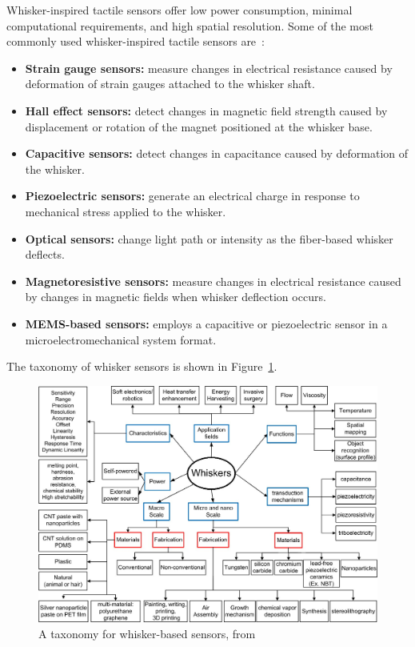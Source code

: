 Whisker-inspired tactile sensors offer low power consumption, minimal computational requirements, and high spatial resolution.
Some of the most commonly used whisker-inspired tactile sensors are~\cite{s22072705}:
\begin{itemize}
    \item \textbf{Strain gauge sensors:} measure changes in electrical resistance caused by deformation of strain gauges attached to the whisker shaft.
    \item \textbf{Hall effect sensors:} detect changes in magnetic field strength caused by displacement or rotation of the magnet positioned at the whisker base.
    \item \textbf{Capacitive sensors:} detect changes in capacitance caused by deformation of the whisker.
    \item \textbf{Piezoelectric sensors:} generate an electrical charge in response to mechanical stress applied to the whisker.
    \item \textbf{Optical sensors:} change light path or intensity as the fiber-based whisker deflects.
    \item \textbf{Magnetoresistive sensors:} measure changes in electrical resistance caused by changes in magnetic fields when whisker deflection occurs.
    \item \textbf{MEMS-based sensors:} employs a capacitive or piezoelectric sensor in a microelectromechanical system format.
\end{itemize}
The taxonomy of whisker sensors is shown in Figure~\ref{fig:taxonomy}.

\begin{figure}[htb]
    \centering
    \includegraphics[width=0.65\textheight]{figures/taxonomy}
    \caption{A taxonomy for whisker-based sensors, from \cite{s22072705}}
    \label{fig:taxonomy}
\end{figure}


